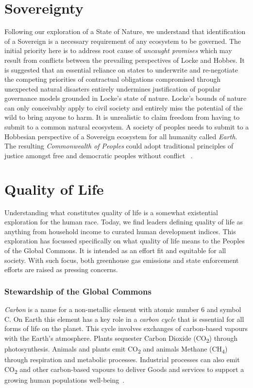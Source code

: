 \documentclass[11pt, oneside]{book}   	%
\begin{document}
\section{Sovereignty}
Following our exploration of a State of Nature, we understand that identification of a Sovereign is a necessary requirement of any ecosystem to be governed.
The initial priority here is to address root cause of \emph{uncaught promises} which may result from conflicts between the prevailing perspectives of Locke and Hobbes.
It is suggested that an essential reliance on states to underwrite and re-negotiate the competing priorities of contractual obligations compromised through unexpected natural disasters entirely undermines justification of popular governance models grounded in Locke's state of nature.
Locke's bounds of nature can only conceivably apply to civil society and entirely miss the potential of the wild to bring anyone to harm.
It is unrealistic to claim freedom from having to submit to a common natural ecosystem.
A society of peoples needs to submit to a Hobbesian perspective of a Sovereign ecosystem for all humanity called \emph{Earth}.
The resulting \emph{Commonwealth of Peoples} could adopt traditional principles of justice amongst free and democratic peoples without conflict ~\cite{jr2}.\

\section{Quality of Life}
Understanding what constitutes quality of life is a somewhat existential exploration for the human race.
Today, we find leaders defining quality of life as anything from household income to curated human development indices.
This exploration has focussed specifically on what quality of life means to the Peoples of the Global Commons.
It is intended as an effort fit and equitable for all society.
With such focus, both greenhouse gas emissions and state enforcement efforts are raised as pressing concerns.

\subsubsection{Stewardship of the Global Commons}
\emph{Carbon} is a name for a non-metallic element with atomic number 6 and symbol C.
On Earth this element has a key role in a \emph{carbon cycle} that is essential for all forms of life on the planet.
This cycle involves exchanges of carbon-based vapours with the Earth's atmosphere.
Plants sequester Carbon Dioxide (CO\textsubscript{2}) through photosynthesis.
Animals and plants emit CO\textsubscript{2} and animals Methane (CH\textsubscript{4}) through respiration and metabolic processes.
Industrial processes can also emit CO\textsubscript{2} and other carbon-based vapours to deliver Goods and services to support a growing human populations well-being~\cite{ng1}.\
\end{document}
